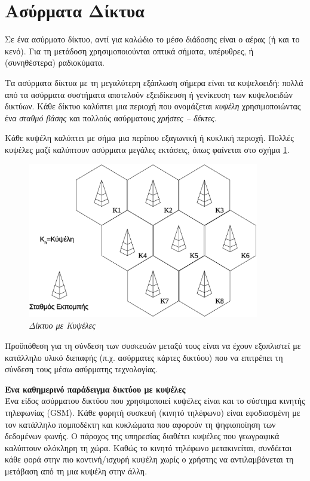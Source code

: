 %
%
\setcounter{section}{4}
\section{Ασύρματα Δίκτυα}
Σε ένα ασύρματο δίκτυο, αντί για καλώδιο το μέσο διάδοσης είναι ο αέρας (ή και το κενό). Για τη μετάδοση χρησιμοποιούνται οπτικά σήματα, υπέρυθρες, ή (συνηθέστερα) ραδιοκύματα. 

Τα ασύρματα δίκτυα με τη μεγαλύτερη εξάπλωση σήμερα είναι τα κυψελοειδή: πολλά από τα ασύρματα συστήματα αποτελούν εξειδίκευση ή γενίκευση των κυψελοειδών δικτύων. Κάθε δίκτυο καλύπτει μια περιοχή που ονομάζεται \emph{κυψέλη} χρησιμοποιώντας ένα \emph{σταθμό βάσης} και πολλούς ασύρματους \emph{χρήστες -- δέκτες}. 

Κάθε κυψέλη καλύπτει με σήμα μια περίπου εξαγωνική ή κυκλική περιοχή. Πολλές κυψέλες μαζί καλύπτουν ασύρματα μεγάλες εκτάσεις, όπως φαίνεται στο σχήμα \ref{2-6}.

\begin{figure}[!ht]
  \centering
  \includegraphics[width=0.90\textwidth]{images/chapter2/2-6}
  \caption {\textsl{Δίκτυο με Κυψέλες}}
  \label{2-6}
\end{figure}

Προϋπόθεση για τη σύνδεση των συσκευών μεταξύ τους είναι να έχουν εξοπλιστεί με κατάλληλο υλικό διεπαφής (π.χ. ασύρματες κάρτες δικτύου) που να επιτρέπει τη σύνδεση τους μέσω ασύρματης τεχνολογίας.

\parbox{\textwidth}{
\boxline
\textbf{Ένα καθημερινό παράδειγμα δικτύου με κυψέλες}\\

Ένα είδος ασύρματου δικτύου που χρησιμοποιεί κυψέλες είναι και το σύστημα κινητής τηλεφωνίας (GSM). Κάθε φορητή συσκευή (κινητό τηλέφωνο) είναι εφοδιασμένη με τον κατάλληλο πομποδέκτη και κυκλώματα που αφορούν τη ψηφιοποίηση των δεδομένων φωνής. Ο πάροχος της υπηρεσίας διαθέτει κυψέλες που γεωγραφικά καλύπτουν ολόκληρη τη χώρα. Καθώς το κινητό τηλέφωνο μετακινείται, συνδέεται κάθε φορά στην πιο κοντινή/ισχυρή κυψέλη χωρίς ο χρήστης να αντιλαμβάνεται τη μετάβαση από τη μια κυψέλη στην άλλη.\\
\boxline}

